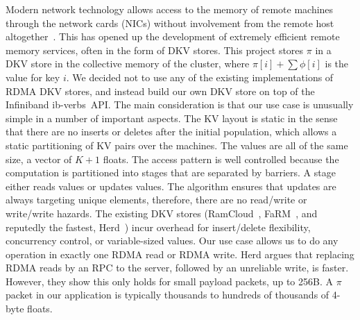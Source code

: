 Modern network technology allows access to the memory of remote machines
through the network cards (NICs) without involvement from the remote host
altogether~\cite{Hamada_infinibandtrade,Beck:2011:PER:2043535.2043537}.
This has opened up the development of
extremely efficient remote memory services, often in the form of DKV stores.
This project stores $\pi$ in a DKV store in the collective memory of the
cluster, where $\pi[i]+\sum\phi[i]$ is the value for key $i$. We decided not
to use any of the existing implementations of RDMA DKV stores, and instead
build our own DKV store on top of the Infiniband ib-verbs~API. The
main consideration is that our use case is unusually simple in a number
of important aspects. The KV layout is static in the sense that there are
no inserts or deletes after the initial population, which allows a static
partitioning of KV pairs over the machines. The values are all of the same size,
a vector of $K+1$ floats. The access pattern is well controlled because the
computation is partitioned into stages that are separated by barriers. A
stage either reads values or updates values. The algorithm ensures that updates
are always targeting unique elements,
therefore, there are no read/write or write/write hazards. The existing DKV
stores (RamCloud~\cite{Ousterhout:2015:RSS:2818727.2806887}, FaRM~\cite{179767},
and reputedly the fastest, Herd~\cite{Kalia:2014:URE:2740070.2626299}) incur
overhead for insert/delete flexibility, concurrency control, or variable-sized
values. Our use case allows us to do any operation in exactly one RDMA read
or RDMA write. Herd argues
that replacing RDMA reads by
an RPC to the server, followed by an unreliable write, is faster. However,
they show this only holds for small payload packets, up to 256B. A $\pi$
packet in our application is typically thousands to hundreds of thousands
of 4-byte floats.
